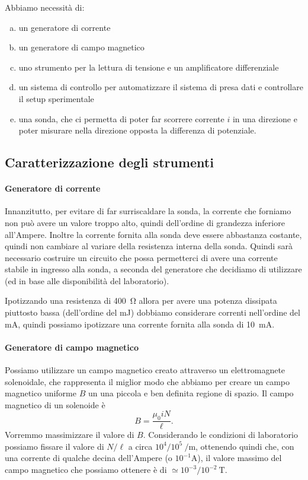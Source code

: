\documentclass[fleqn,varvw,11pt,tightenlines]{memo}
\begin{document}
Abbiamo necessità di:
\begin{enumerate}[a.]
    \item un generatore di corrente
    \item un generatore di campo magnetico
    \item uno strumento per la lettura di tensione e un amplificatore differenziale
    \item un sistema di controllo per automatizzare il sistema di presa dati e controllare il setup sperimentale
    \item una sonda, che ci permetta di poter far scorrere corrente $i$ in una direzione e poter misurare nella direzione opposta la differenza di potenziale.
\end{enumerate}

\subsection{Caratterizzazione degli strumenti}
\paragraph{Generatore di corrente} Innanzitutto, per evitare di far surriscaldare la sonda, la corrente che forniamo non può avere un valore troppo alto, quindi dell'ordine di grandezza inferiore all'Ampere. Inoltre la corrente fornita alla sonda deve essere abbastanza costante, quindi non cambiare al variare della resistenza interna della sonda. Quindi sarà necessario costruire un circuito che possa permetterci di avere una corrente stabile in ingresso alla sonda, a seconda del generatore che decidiamo di utilizzare (ed in base alle disponibilità del laboratorio). 

Ipotizzando una resistenza di \SI{400}{\ohm} allora per avere una potenza dissipata piuttosto bassa (dell'ordine del \si{\milli\joule}) dobbiamo considerare correnti nell'ordine del \si{\milli\ampere}, quindi possiamo ipotizzare una corrente fornita alla sonda di \SI{10}{\milli\ampere}.

\paragraph{Generatore di campo magnetico} Possiamo utilizzare un campo magnetico creato attraverso un elettromagnete solenoidale, che rappresenta il miglior modo che abbiamo per creare un campo magnetico uniforme $B$ un una piccola e ben definita regione  di spazio. Il campo magnetico di un solenoide è \begin{equation}
    B=\frac{\mu_0iN}{\ell}. 
\end{equation} Vorremmo massimizzare il valore di $B$. Considerando le condizioni di laboratorio possiamo fissare il valore di $N/\ell$ a circa $10^4/10^5~\si{\per\metre}$, ottenendo quindi che, con una corrente di qualche decina dell'Ampere (o $10^{-1}\si{\ampere}$), il valore massimo del campo magnetico che possiamo ottenere è di $\simeq 10^{-3}/10^{-2}~\si{\tesla}$. 
\end{document}
